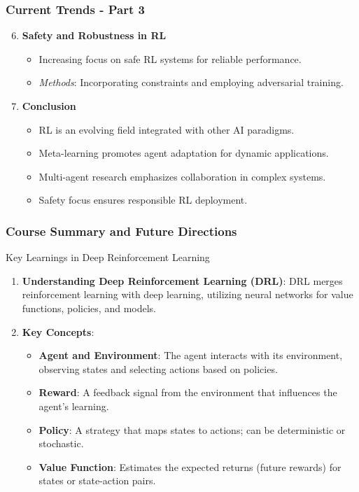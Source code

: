 \documentclass[aspectratio=169]{beamer}
\begin{document}
\begin{frame}[fragile]
    \frametitle{Current Trends - Part 3}
    \begin{enumerate}
        \setcounter{enumi}{5}
        \item \textbf{Safety and Robustness in RL}
            \begin{itemize}
                \item Increasing focus on safe RL systems for reliable performance.
                \item \textit{Methods}: Incorporating constraints and employing adversarial training.
            \end{itemize}

        \item \textbf{Conclusion}
            \begin{itemize}
                \item RL is an evolving field integrated with other AI paradigms.
                \item Meta-learning promotes agent adaptation for dynamic applications.
                \item Multi-agent research emphasizes collaboration in complex systems.
                \item Safety focus ensures responsible RL deployment.
            \end{itemize}
    \end{enumerate}
\end{frame}

\begin{frame}[fragile]
    \frametitle{Course Summary and Future Directions}
    \begin{block}{Key Learnings in Deep Reinforcement Learning}
        \begin{enumerate}
            \item \textbf{Understanding Deep Reinforcement Learning (DRL)}:  
            DRL merges reinforcement learning with deep learning, utilizing neural networks for value functions, policies, and models.
            
            \item \textbf{Key Concepts}:
            \begin{itemize}
                \item \textbf{Agent and Environment}: The agent interacts with its environment, observing states and selecting actions based on policies.
                \item \textbf{Reward}: A feedback signal from the environment that influences the agent's learning.
                \item \textbf{Policy}: A strategy that maps states to actions; can be deterministic or stochastic.
                \item \textbf{Value Function}: Estimates the expected returns (future rewards) for states or state-action pairs.
            \end{itemize}
        \end{enumerate}
    \end{block}
\end{frame}
\end{document}

